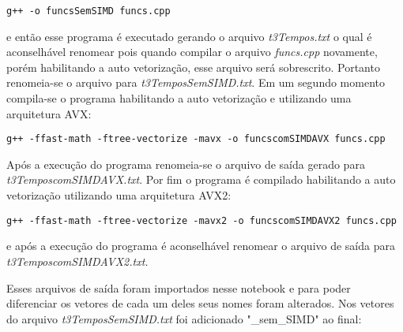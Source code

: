 \documentclass[11pt]{article}
\begin{document}
    \begin{verbatim}
g++ -o funcsSemSIMD funcs.cpp
\end{verbatim}

    e então esse programa é executado gerando o arquivo \emph{t3Tempos.txt}
o qual é aconselhável renomear pois quando compilar o arquivo
\emph{funcs.cpp} novamente, porém habilitando a auto vetorização, esse
arquivo será sobrescrito. Portanto renomeia-se o arquivo para
\emph{t3TemposSemSIMD.txt}. Em um segundo momento compila-se o programa
habilitando a auto vetorização e utilizando uma arquitetura AVX:

    \begin{verbatim}
g++ -ffast-math -ftree-vectorize -mavx -o funcscomSIMDAVX funcs.cpp
\end{verbatim}

    Após a execução do programa renomeia-se o arquivo de saída gerado para
\emph{t3TemposcomSIMDAVX.txt}. Por fim o programa é compilado
habilitando a auto vetorização utilizando uma arquitetura AVX2:

    \begin{verbatim}
g++ -ffast-math -ftree-vectorize -mavx2 -o funcscomSIMDAVX2 funcs.cpp
\end{verbatim}

    e após a execução do programa é aconselhável renomear o arquivo de saída
para \emph{t3TemposcomSIMDAVX2.txt.}

    Esses arquivos de saída foram importados nesse notebook e para poder
diferenciar os vetores de cada um deles seus nomes foram alterados. Nos
vetores do arquivo \emph{t3TemposSemSIMD.txt} foi adicionado
"\_sem\_SIMD" ao final:
\end{document}
